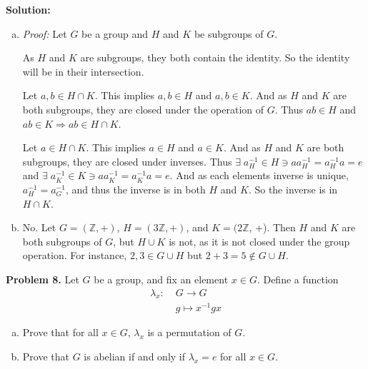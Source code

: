 \documentclass[12pt, letterpaper]{article}
\newenvironment{problem}
    [1]
    {\noindent \textbf{Problem #1.}}
    {\vspace{3mm}}
\newenvironment{solution}
    [0]
    {\noindent \textbf{Solution:}} 
    {\vspace{3mm}}
\begin{document}
\begin{solution}
    \begin{enumerate}[(a)]
        \item \emph{Proof:} Let $G$ be a group and $H$ and $K$ be subgroups of $G$.
        
        \bigskip\noindent
        As $H$ and $K$ are subgroups, they both contain the identity. 
        So the identity will be in their intersection. 

        \bigskip\noindent
        Let $a, b \in H \cap K$. This implies $a, b \in H$ and $a, b \in K$. And
        as $H$ and $K$ are both subgroups, they are closed under the operation of $G$.
        Thus $ab \in H$ and $ab \in K \Rightarrow ab \in H \cap K$.

        \bigskip\noindent
        Let $a \in H \cap K$. This implies $a \in H$ and $a \in K$. And
        as $H$ and $K$ are both subgroups, they are closed under inverses.
        Thus $\exists \; a^{-1}_H \in H \ni aa^{-1}_H = a^{-1}_Ha = e$ and $\exists \; a^{-1}_K \in 
        K \ni aa^{-1}_K = a^{-1}_Ka = e$. And as each elements inverse is unique,  $a^{-1}_H = a^{-1}_G$,
        and thus the inverse is in both $H$ and $K$. So the inverse is in $H \cap K$.

        \item No. Let $G = (\mathbb{Z}, +)$, $H = (3\mathbb{Z}, +)$, and $K = (2\mathbb{Z}$, +). 
        Then $H$ and $K$ are both subgroups of $G$, but $H \cup K$ is not, as it is not 
        closed under the group operation. For instance, $2, 3 \in G \cup H$ but $2 + 3 
        = 5 \notin G \cup H$.

    \end{enumerate}
\end{solution}

\begin{problem}{8}
    Let $G$ be a group, and fix an element $x \in G$. Define a function
    \begin{align*}
        \lambda_x: \; &G \rightarrow G\\
        &g \mapsto x^{-1}gx
    \end{align*}
    
    \begin{enumerate}[(a)]
        \item Prove that for all $x \in G$, $\lambda_x$ is a permutation of $G$.
        \item Prove that $G$ is abelian if and only if $\lambda_x = e$ for
        all $x \in G$.
    \end{enumerate}
\end{problem}
\end{document}
